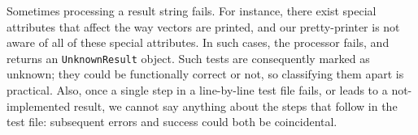 \documentclass[
    sigplan,
    10pt,
    review, %
    natbib=false %
 ]{acmart}
\newcommand\mb[1]{\todo[color=purple!20,size=\scriptsize]{#1}}
\newcommand\CoqR{CoqR}
\begin{document}
Sometimes processing a result string fails.
For instance, there exist special attributes that affect
the way vectors are printed, and our pretty-printer is not aware of all of these special attributes. In such cases, the processor fails, and returns an \texttt{UnknownResult} object. Such tests are consequently marked as \textsf{unknown}; they could be functionally correct or not, so classifying them apart is practical.
%
%
Also, once a single step in a line-by-line test file fails, or leads to a not-implemented result, we cannot say anything about the steps that follow in the test file: subsequent errors and success could both be coincidental.
\end{document}
